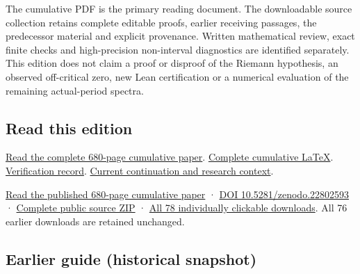 \documentclass[
]{article}
\begin{document}
The cumulative PDF is the primary reading document. The downloadable
source collection retains complete editable proofs, earlier receiving
passages, the predecessor material and explicit provenance. Written
mathematical review, exact finite checks and high-precision non-interval
diagnostics are identified separately. This edition does not claim a
proof or disproof of the Riemann hypothesis, an observed off-critical
zero, new Lean certification or a numerical evaluation of the remaining
actual-period spectra.

\subsection{Read this edition}\label{read-this-edition-5}

\href{https://github.com/KokunoYumeto/zeta-function-research-reader/blob/main/workbenches/splitzero-tandem/continuations/20260916-arithmetic-source-and-flag-continuation/15_CURRENT_MIXED_CONTROL_READER.pdf}{Read
the complete 680-page cumulative paper}.
\href{https://github.com/KokunoYumeto/zeta-function-research-reader/blob/main/workbenches/splitzero-tandem/continuations/20260916-arithmetic-source-and-flag-continuation/14_CURRENT_KERNEL_AND_MULTIPLICITY_PROOFS.tex}{Complete
cumulative LaTeX}.
\href{https://github.com/KokunoYumeto/zeta-function-research-reader/blob/main/workbenches/splitzero-tandem/continuations/20260916-arithmetic-source-and-flag-continuation/12_VALIDATION.md}{Verification
record}.
\href{https://github.com/KokunoYumeto/zeta-function-research-reader/blob/main/workbenches/splitzero-tandem/continuations/20260916-arithmetic-source-and-flag-continuation/00_CONTINUE_HERE.md}{Current
continuation and research context}.

\href{https://zenodo.org/api/records/22802593/files/77-splitzero-source-transport-reader.pdf/content}{Read
the published 680-page cumulative paper} ·
\href{https://doi.org/10.5281/zenodo.22802593}{DOI
10.5281/zenodo.22802593} ·
\href{https://zenodo.org/api/records/22802593/files/78-splitzero-source-transport-sources.zip/content}{Complete
public source ZIP} ·
\href{https://github.com/KokunoYumeto/zeta-function-research-reader/blob/main/calculation_edition_20260916_arithmetic_source_and_flag/README.md}{All
78 individually clickable downloads}. All 76 earlier downloads are
retained unchanged.

\subsection{Earlier guide (historical
snapshot)}\label{earlier-guide-historical-snapshot-9}
\end{document}
